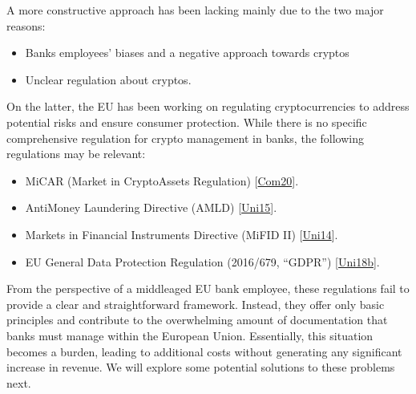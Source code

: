 \documentclass[letterpaper,10pt,english]{jupyterBook}
\begin{document}
\sphinxAtStartPar
A more constructive approach has been lacking mainly due to the two major reasons:
\begin{itemize}
\item {} 
\sphinxAtStartPar
Banks employees’ biases and a negative approach towards cryptos

\item {} 
\sphinxAtStartPar
Unclear regulation about cryptos.

\end{itemize}

\sphinxAtStartPar
On the latter, the EU has been working on regulating cryptocurrencies to address potential risks and ensure consumer protection. While there is no specific comprehensive regulation for crypto management in banks, the following regulations may be relevant:
\begin{itemize}
\item {} 
\sphinxAtStartPar
MiCAR (Market in Crypto\sphinxhyphen{}Assets Regulation) {[}\hyperlink{cite.LEGACY/legacy:id96}{Com20}{]}.

\item {} 
\sphinxAtStartPar
Anti\sphinxhyphen{}Money Laundering Directive (AMLD) {[}\hyperlink{cite.LEGACY/legacy:id98}{Uni15}{]}.

\item {} 
\sphinxAtStartPar
Markets in Financial Instruments Directive (MiFID II) {[}\hyperlink{cite.LEGACY/legacy:id99}{Uni14}{]}.

\item {} 
\sphinxAtStartPar
EU General Data Protection Regulation (2016/679, “GDPR”) {[}\hyperlink{cite.LEGACY/legacy:id97}{Uni18b}{]}.

\end{itemize}

\sphinxAtStartPar
From the perspective of a middle\sphinxhyphen{}aged EU bank employee, these regulations fail to provide a clear and straightforward framework. Instead, they offer only basic principles and contribute to the overwhelming amount of documentation that banks must manage within the European Union. Essentially, this situation becomes a burden, leading to additional costs without generating any significant increase in revenue. We will explore some potential solutions to these problems next.
\end{document}
